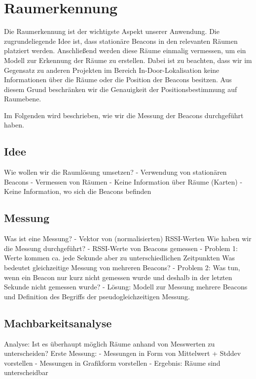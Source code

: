 \section{Raumerkennung}

Die Raumerkennung ist der wichtigste Aspekt unserer Anwendung.
Die zugrundeliegende Idee ist, dass stationäre Beacons in den
relevanten Räumen platziert werden. Anschließend werden diese
Räume einmalig vermessen, um ein Modell zur Erkennung der
Räume zu erstellen.
Dabei ist zu beachten, dass wir im Gegensatz zu anderen Projekten
im Bereich In-Door-Lokalisation keine Informationen über die
Räume oder die Position der Beacons besitzen. Aus diesem Grund
beschränken wir die Genauigkeit der Positionsbestimmung auf
Raumebene.

Im Folgenden wird beschrieben, wie wir die Messung der Beacons
durchgeführt haben. 

\subsection{Idee}

Wie wollen wir die Raumlösung umsetzen?
- Verwendung von stationären Beacons
- Vermessen von Räumen
- Keine Information über Räume (Karten)
- Keine Information, wo sich die Beacons befinden

\subsection{Messung}

Was ist eine Messung?
- Vektor von (normalisierten) RSSI-Werten
Wie haben wir die Messung durchgeführt?
- RSSI-Werte von Beacons gemessen
- Problem 1: Werte kommen ca. jede Sekunde aber zu unterschiedlichen Zeitpunkten
  Was bedeutet gleichzeitige Messung von mehreren Beacons?
- Problem 2: Was tun, wenn ein Beacon nur kurz nicht gemessen wurde und deshalb
  in der letzten Sekunde nicht gemessen wurde?
- Lösung: Modell zur Messung mehrere Beacons und Definition des Begriffs der
  pseudogleichzeitigen Messung.

\subsection{Machbarkeitsanalyse}

Analyse: Ist es überhaupt möglich Räume anhand von Messwerten zu unterscheiden?
Erste Messung:
- Messungen in Form von Mittelwert + Stddev vorstellen
- Messungen in Grafikform vorstellen
- Ergebnis: Räume sind unterscheidbar

